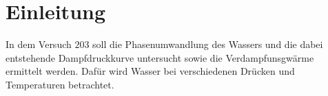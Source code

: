 \section{Einleitung}
  In dem Versuch $203$ soll die Phasenumwandlung des Wassers und die dabei entstehende Dampfdruckkurve untersucht sowie die Verdampfunsgwärme ermittelt werden.
  Dafür wird Wasser bei verschiedenen Drücken und Temperaturen betrachtet.
\label{sec:Einleitung}
